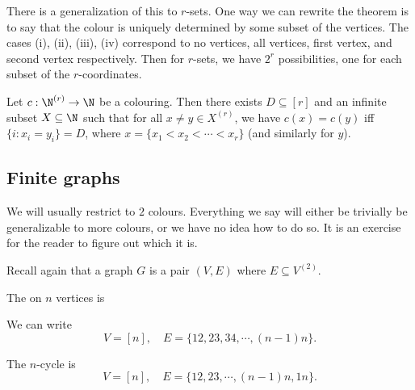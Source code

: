 \documentclass[a4paper]{article}
\begin{document}
There is a generalization of this to $r$-sets. One way we can rewrite the theorem is to say that the colour is uniquely determined by some subset of the vertices. The cases (i), (ii), (iii), (iv) correspond to no vertices, all vertices, first vertex, and second vertex respectively. Then for $r$-sets, we have $2^r$ possibilities, one for each subset of the $r$-coordinates.

\begin{thm}
  Let $c: \N^{(r)} \to \N$ be a colouring. Then there exists $D \subseteq [r]$ and an infinite subset $X \subseteq \N$ such that for all $x \not= y \in X^{(r)}$, we have $c(x) = c(y)$ iff $\{i: x_i = y_i\} = D$, where $x = \{x_1 < x_2 < \cdots < x_r\}$ (and similarly for $y$).
\end{thm} %

\subsection{Finite graphs}
We will usually restrict to $2$ colours. Everything we say will either be trivially be generalizable to more colours, or we have no idea how to do so. It is an exercise for the reader to figure out which it is.

Recall again that a graph $G$ is a pair $(V, E)$ where $E \subseteq V^{(2)}$.
\begin{eg}
  The  on $n$ vertices  is
  \begin{center}
  \end{center}
  We can write
  \[
    V = [n],\quad E = \{12, 23, 34, \cdots, (n-1)n\}.
  \]
\end{eg}

\begin{eg}
  The $n$-cycle  is
  \[
    V = [n],\quad E = \{12, 23, \cdots, (n-1)n, 1n\}.
  \]
\end{eg}
\end{document}
